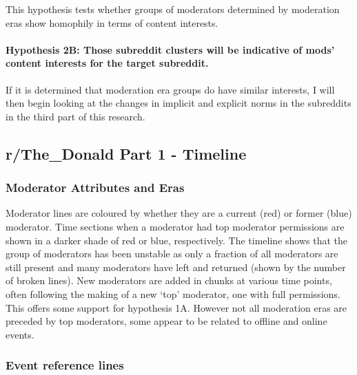 \documentclass[11pt]{article}
\begin{document}
This hypothesis tests whether groups of moderators determined by
moderation eras show homophily in terms of content interests.

\paragraph{Hypothesis 2B: Those subreddit clusters will be indicative of
mods' content interests for the target
subreddit.}\label{hypothesis-2b-those-subreddit-clusters-will-be-indicative-of-mods-content-interests-for-the-target-subreddit.}

If it is determined that moderation era groups do have similar
interests, I will then begin looking at the changes in implicit and
explicit norms in the subreddits in the third part of this research.

\subsection{r/The\_Donald Part 1 -
Timeline}\label{rthe_donald-part-1---timeline}

\subsubsection{Moderator Attributes and
Eras}\label{moderator-attributes-and-eras}

Moderator lines are coloured by whether they are a current (red) or
former (blue) moderator. Time sections when a moderator had top
moderator permissions are shown in a darker shade of red or blue,
respectively. The timeline shows that the group of moderators has been
unstable as only a fraction of all moderators are still present and many
moderators have left and returned (shown by the number of broken lines).
New moderators are added in chunks at various time points, often
following the making of a new `top' moderator, one with full
permissions. This offers some support for hypothesis 1A. However not all
moderation eras are preceded by top moderators, some appear to be
related to offline and online events.

\subsubsection{Event reference lines}\label{event-reference-lines}
\end{document}
